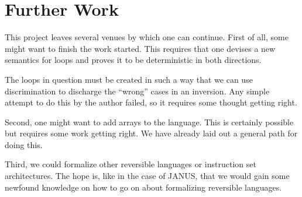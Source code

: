 \chapter{Further Work}

This project leaves several venues by which one can continue. First of
all, some might want to finish the work started. This requires that
one devises a new semantics for loops and proves it to be
deterministic in both directions.

The loops in question must be created in such a way that we can use
discrimination to discharge the ``wrong'' cases in an inversion. Any
simple attempt to do this by the author failed, so it requires some
thought getting right.

Second, one might want to add arrays to the language. This is
certainly possible but requires some work getting right. We have
already laid out a general path for doing this.

Third, we could formalize other reversible languages or instruction
set architectures. The hope is, like in the case of JANUS, that we
would gain some newfound knowledge on how to go on about formalizing
reversible languages.

